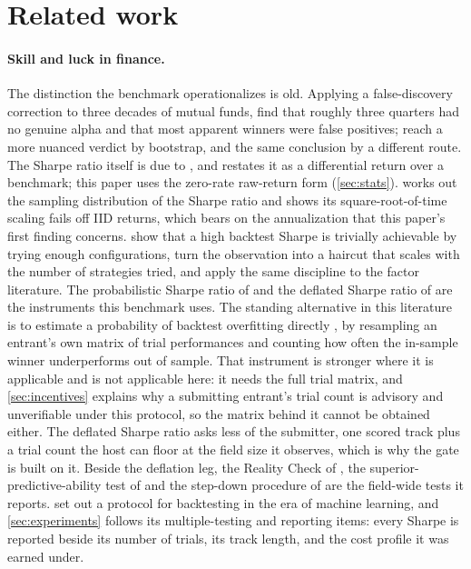 \section{Related work}\label{sec:related}

\paragraph{Skill and luck in finance.} The distinction the benchmark operationalizes is old. Applying a false-discovery correction to three decades of mutual funds, \citet{barras2010false} find that roughly three quarters had no genuine alpha and that most apparent winners were false positives; \citet{kosowski2006stars} reach a more nuanced verdict by bootstrap, and \citet{fama2010luck} the same conclusion by a different route. The Sharpe ratio itself is due to \citet{sharpe1966mutual}, and \citet{sharpe1994sharpe} restates it as a differential return over a benchmark; this paper uses the zero-rate raw-return form (\cref{sec:stats}). \citet{lo2002sharpe} works out the sampling distribution of the Sharpe ratio and shows its square-root-of-time scaling fails off IID returns, which bears on the annualization that this paper's first finding concerns. \citet{bailey2014pseudo} show that a high backtest Sharpe is trivially achievable by trying enough configurations, \citet{harvey2015backtesting} turn the observation into a haircut that scales with the number of strategies tried, and \citet{harvey2016cross} apply the same discipline to the factor literature. The probabilistic Sharpe ratio of \citet{bailey2012sharpe} and the deflated Sharpe ratio of \citet{bailey2014deflated} are the instruments this benchmark uses. The standing alternative in this literature is to estimate a probability of backtest overfitting directly \citep{bailey2017pbo}, by resampling an entrant's own matrix of trial performances and counting how often the in-sample winner underperforms out of sample. That instrument is stronger where it is applicable and is not applicable here: it needs the full trial matrix, and \cref{sec:incentives} explains why a submitting entrant's trial count is advisory and unverifiable under this protocol, so the matrix behind it cannot be obtained either. The deflated Sharpe ratio asks less of the submitter, one scored track plus a trial count the host can floor at the field size it observes, which is why the gate is built on it. Beside the deflation leg, the Reality Check of \citet{white2000reality}, the superior-predictive-ability test of \citet{hansen2005spa} and the step-down procedure of \citet{romano2005stepwise} are the field-wide tests it reports. \citet{arnott2019protocol} set out a protocol for backtesting in the era of machine learning, and \cref{sec:experiments} follows its multiple-testing and reporting items: every Sharpe is reported beside its number of trials, its track length, and the cost profile it was earned under.

